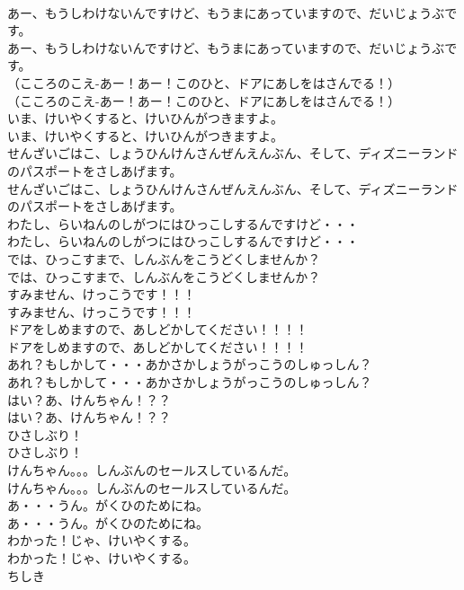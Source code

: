 \documentclass[8pt]{extreport}
\begin{document}
\begin{CJK}{UTF8}{min}
\\	あー、もうしわけないんですけど、もうまにあっていますので、だいじょうぶです。
\\	あー、もうしわけないんですけど、もうまにあっていますので、だいじょうぶです。
\\	（こころのこえ-あー！あー！このひと、ドアにあしをはさんでる！）
\\	（こころのこえ-あー！あー！このひと、ドアにあしをはさんでる！）
\\	いま、けいやくすると、けいひんがつきますよ。
\\	いま、けいやくすると、けいひんがつきますよ。
\\	せんざいごはこ、しょうひんけんさんぜんえんぶん、そして、ディズニーランドのパスポートをさしあげます。
\\	せんざいごはこ、しょうひんけんさんぜんえんぶん、そして、ディズニーランドのパスポートをさしあげます。
\\	わたし、らいねんのしがつにはひっこしするんですけど・・・
\\	わたし、らいねんのしがつにはひっこしするんですけど・・・
\\	では、ひっこすまで、しんぶんをこうどくしませんか？
\\	では、ひっこすまで、しんぶんをこうどくしませんか？
\\	すみません、けっこうです！！！
\\	すみません、けっこうです！！！
\\	ドアをしめますので、あしどかしてください！！！！
\\	ドアをしめますので、あしどかしてください！！！！
\\	あれ？もしかして・・・あかさかしょうがっこうのしゅっしん？
\\	あれ？もしかして・・・あかさかしょうがっこうのしゅっしん？
\\	はい？あ、けんちゃん！？？
\\	はい？あ、けんちゃん！？？
\\	ひさしぶり！
\\	ひさしぶり！
\\	けんちゃん。。。しんぶんのセールスしているんだ。
\\	けんちゃん。。。しんぶんのセールスしているんだ。
\\	あ・・・うん。がくひのためにね。
\\	あ・・・うん。がくひのためにね。
\\	わかった！じゃ、けいやくする。
\\	わかった！じゃ、けいやくする。
\\	ちしき

\end{CJK}
\end{document}
